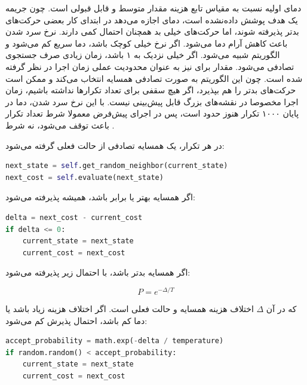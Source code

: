 \documentclass[10.5pt]{exam}
\begin{document}
دمای اولیه
نسبت به مقیاس تابع هزینه مقدار متوسط و قابل قبولی است. چون جریمه یک هدف پوشش داده‌نشده
است، دمای
اجازه می‌دهد در ابتدای کار بعضی حرکت‌های بدتر پذیرفته شوند، اما حرکت‌های خیلی بد همچنان احتمال کمی دارند.
نرخ سرد شدن
باعث کاهش آرام دما می‌شود. اگر نرخ خیلی کوچک باشد، دما سریع کم می‌شود و الگوریتم شبیه
می‌شود. اگر خیلی نزدیک به ۱ باشد، زمان زیادی صرف جستجوی تصادفی می‌شود. مقدار
برای
نیز به عنوان محدودیت عملی زمان اجرا در نظر گرفته شده است. چون این الگوریتم به صورت تصادفی همسایه انتخاب می‌کند و ممکن است حرکت‌های بدتر را هم بپذیرد، اگر هیچ سقفی برای تعداد تکرارها نداشته باشیم، زمان اجرا مخصوصا در نقشه‌های بزرگ قابل پیش‌بینی نیست. با این نرخ سرد شدن، دما در پایان ۱۰۰۰ تکرار هنوز حدود
است، پس در اجرای پیش‌فرض معمولا شرط تعداد تکرار باعث توقف می‌شود، نه شرط
.

در هر تکرار، یک همسایه تصادفی از حالت فعلی گرفته می‌شود:

\begin{latin}
\begin{lstlisting}[language=Python]
next_state = self.get_random_neighbor(current_state)
next_cost = self.evaluate(next_state)
\end{lstlisting}
\end{latin}

اگر همسایه بهتر یا برابر باشد، همیشه پذیرفته می‌شود:

\begin{latin}
\begin{lstlisting}[language=Python]
delta = next_cost - current_cost
if delta <= 0:
    current_state = next_state
    current_cost = next_cost
\end{lstlisting}
\end{latin}

اگر همسایه بدتر باشد، با احتمال زیر پذیرفته می‌شود:

\[
    P = e^{-\Delta / T}
\]

که در آن
\(\Delta\)
اختلاف هزینه همسایه و حالت فعلی است. اگر اختلاف هزینه زیاد باشد یا دما کم باشد، احتمال پذیرش کم می‌شود:

\begin{latin}
\begin{lstlisting}[language=Python]
accept_probability = math.exp(-delta / temperature)
if random.random() < accept_probability:
    current_state = next_state
    current_cost = next_cost
\end{lstlisting}
\end{latin}
\end{document}
